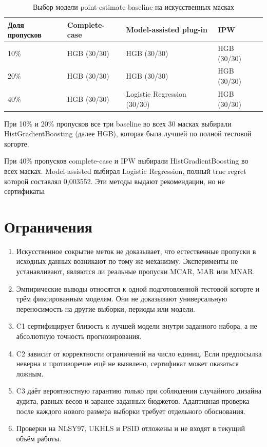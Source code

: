 \documentclass[12pt,a4paper]{article}
\begin{document}
\begin{table}[H]
\centering
\begin{tabular}{llll}
\toprule
Доля пропусков & Complete-case & Model-assisted plug-in & IPW\\
\midrule
10\% & HGB (30/30) & HGB (30/30) & HGB (30/30)\\
20\% & HGB (30/30) & HGB (30/30) & HGB (30/30)\\
40\% & HGB (30/30) & Logistic Regression (30/30) & HGB (30/30)\\
\bottomrule
\end{tabular}
\caption{Выбор модели point-estimate baseline на искусственных масках}
\end{table}

При 10\% и 20\% пропусков все три baseline во всех 30 масках выбирали HistGradientBoosting (далее HGB), которая была лучшей по полной тестовой когорте.

При 40\% пропусков complete-case и IPW выбирали HistGradientBoosting во всех масках. Model-assisted выбирал Logistic Regression, полный true regret которой составлял 0,003552. Эти методы выдают рекомендации, но не сертификаты.

\fussy
\section{Ограничения}
\begin{enumerate}
\item Искусственное сокрытие меток не доказывает, что естественные пропуски в исходных данных возникают по тому же механизму. Эксперименты не устанавливают, являются ли реальные пропуски MCAR, MAR или MNAR.
\item Эмпирические выводы относятся к одной подготовленной тестовой когорте и трём фиксированным моделям. Они не доказывают универсальную переносимость на другие выборки, периоды или модели.
\item C1 сертифицирует близость к лучшей модели внутри заданного набора, а не абсолютную точность прогнозирования.
\item C2 зависит от корректности ограничений на число единиц. Если предпосылка неверна и противоречие ещё не выявлено, сертификат может оказаться ложным.
\item C3 даёт вероятностную гарантию только при соблюдении случайного дизайна аудита, равных весов и заранее заданных бюджетов. Адаптивная проверка после каждого нового размера выборки требует отдельного обоснования.
\item Проверки на NLSY97, UKHLS и PSID отложены и не входят в текущий объём работы.
\end{enumerate}
\end{document}
